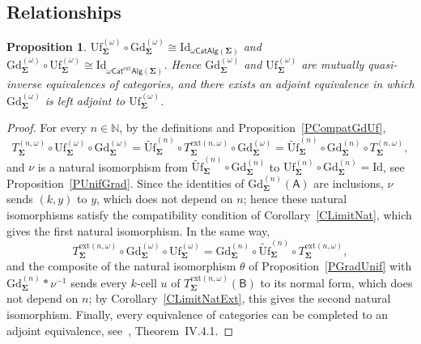 \documentclass{amsart}
\theoremstyle{plain}
\newtheorem{proposition}[theorem]{Proposition}
\theoremstyle{definition}
\begin{document}
\subsection{Relationships}\label{SRelOmega}

\begin{proposition}\label{POmegaGdUf}
$\mathrm{Uf}^{(\omega)}_{\mathbf{\Sigma}}\circ\mathrm{Gd}^{(\omega)}_{\mathbf{\Sigma}}\cong\mathrm{Id}_{\omega\mathsf{CatAlg}(\mathbf{\Sigma})}$ and $\mathrm{Gd}^{(\omega)}_{\mathbf{\Sigma}}\circ\mathrm{Uf}^{(\omega)}_{\mathbf{\Sigma}}\cong\mathrm{Id}_{\omega\mathsf{Cat}^{\mathrm{ext}}\mathsf{Alg}(\mathbf{\Sigma})}$. Hence $\mathrm{Gd}^{(\omega)}_{\mathbf{\Sigma}}$ and $\mathrm{Uf}^{(\omega)}_{\mathbf{\Sigma}}$ are mutually quasi-inverse equivalences of categories, and there exists an adjoint equivalence in which $\mathrm{Gd}^{(\omega)}_{\mathbf{\Sigma}}$ is left adjoint to $\mathrm{Uf}^{(\omega)}_{\mathbf{\Sigma}}$.
\end{proposition}
\begin{proof}
For every $n\in\mathbb{N}$, by the definitions and Proposition~\ref{PCompatGdUf},
$$
T^{(n,\omega)}_{\mathbf{\Sigma}}\circ\mathrm{Uf}^{(\omega)}_{\mathbf{\Sigma}}\circ\mathrm{Gd}^{(\omega)}_{\mathbf{\Sigma}}
=\widetilde{\mathrm{Uf}}^{(n)}_{\mathbf{\Sigma}}\circ T^{\mathrm{ext}(n,\omega)}_{\mathbf{\Sigma}}\circ\mathrm{Gd}^{(\omega)}_{\mathbf{\Sigma}}
=\widetilde{\mathrm{Uf}}^{(n)}_{\mathbf{\Sigma}}\circ\mathrm{Gd}^{(n)}_{\mathbf{\Sigma}}\circ T^{(n,\omega)}_{\mathbf{\Sigma}},
$$
and $\nu$ is a natural isomorphism from $\widetilde{\mathrm{Uf}}^{(n)}_{\mathbf{\Sigma}}\circ\mathrm{Gd}^{(n)}_{\mathbf{\Sigma}}$ to $\mathrm{Uf}^{(n)}_{\mathbf{\Sigma}}\circ\mathrm{Gd}^{(n)}_{\mathbf{\Sigma}}=\mathrm{Id}$, see Proposition~\ref{PUnifGrad}. Since the identities of $\mathrm{Gd}^{(n)}_{\mathbf{\Sigma}}(\boldsymbol{\mathsf{A}})$ are inclusions, $\nu$ sends $(k,y)$ to $y$, which does not depend on $n$; hence these natural isomorphisms satisfy the compatibility condition of Corollary~\ref{CLimitNat}, which gives the first natural isomorphism. In the same way,
$$
T^{\mathrm{ext}(n,\omega)}_{\mathbf{\Sigma}}\circ\mathrm{Gd}^{(\omega)}_{\mathbf{\Sigma}}\circ\mathrm{Uf}^{(\omega)}_{\mathbf{\Sigma}}
=\mathrm{Gd}^{(n)}_{\mathbf{\Sigma}}\circ\widetilde{\mathrm{Uf}}^{(n)}_{\mathbf{\Sigma}}\circ T^{\mathrm{ext}(n,\omega)}_{\mathbf{\Sigma}},
$$
and the composite of the natural isomorphism $\theta$ of Proposition~\ref{PGradUnif} with $\mathrm{Gd}^{(n)}_{\mathbf{\Sigma}}\ast\nu^{-1}$ sends every $k$-cell $u$ of $T^{\mathrm{ext}(n,\omega)}_{\mathbf{\Sigma}}(\boldsymbol{\mathsf{B}})$ to its normal form, which does not depend on $n$; by Corollary~\ref{CLimitNatExt}, this gives the second natural isomorphism. Finally, every equivalence of categories can be completed to an adjoint equivalence, see~\cite{sM98}, Theorem~IV.4.1.
\end{proof}
\end{document}
